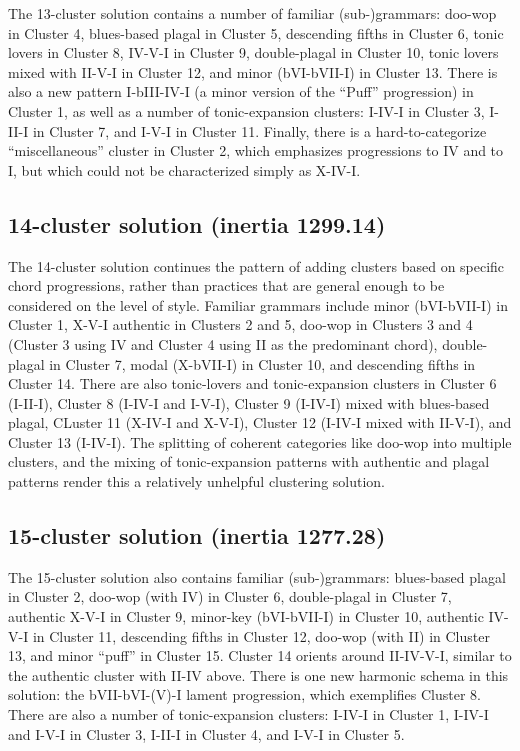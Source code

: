 The 13-cluster solution contains a number of familiar (sub-)grammars: doo-wop in Cluster 4, blues-based plagal in Cluster 5, descending fifths in Cluster 6, tonic lovers in Cluster 8, IV-V-I in Cluster 9, double-plagal in Cluster 10, tonic lovers mixed with II-V-I in Cluster 12, and minor (bVI-bVII-I) in Cluster 13. There is also a new pattern I-bIII-IV-I (a minor version of the ``Puff'' progression) in Cluster 1, as well as a number of tonic-expansion clusters: I-IV-I in Cluster 3, I-II-I in Cluster 7, and I-V-I in Cluster 11. Finally, there is a hard-to-categorize ``miscellaneous'' cluster in Cluster 2, which emphasizes progressions to IV and to I, but which could not be characterized simply as X-IV-I.

\subsection{14-cluster solution (inertia 1299.14)}
\label{14-clustersolutioninertia1299.14}

The 14-cluster solution continues the pattern of adding clusters based on specific chord progressions, rather than practices that are general enough to be considered on the level of style. Familiar grammars include minor (bVI-bVII-I) in Cluster 1, X-V-I authentic in Clusters 2 and 5, doo-wop in Clusters 3 and 4 (Cluster 3 using IV and Cluster 4 using II as the predominant chord), double-plagal in Cluster 7, modal (X-bVII-I) in Cluster 10, and descending fifths in Cluster 14. There are also tonic-lovers and tonic-expansion clusters in Cluster 6 (I-II-I), Cluster 8 (I-IV-I and I-V-I), Cluster 9 (I-IV-I) mixed with blues-based plagal, CLuster 11 (X-IV-I and X-V-I), Cluster 12 (I-IV-I mixed with II-V-I), and Cluster 13 (I-IV-I). The splitting of coherent categories like doo-wop into multiple clusters, and the mixing of tonic-expansion patterns with authentic and plagal patterns render this a relatively unhelpful clustering solution.

\subsection{15-cluster solution (inertia 1277.28)}
\label{15-clustersolutioninertia1277.28}

The 15-cluster solution also contains familiar (sub-)grammars: blues-based plagal in Cluster 2, doo-wop (with IV) in Cluster 6, double-plagal in Cluster 7, authentic X-V-I in Cluster 9, minor-key (bVI-bVII-I) in Cluster 10, authentic IV-V-I in Cluster 11, descending fifths in Cluster 12, doo-wop (with II) in Cluster 13, and minor ``puff'' in Cluster 15. Cluster 14 orients around II-IV-V-I, similar to the authentic cluster with II-IV above. There is one new harmonic schema in this solution: the bVII-bVI-(V)-I lament progression, which exemplifies Cluster 8. There are also a number of tonic-expansion clusters: I-IV-I in Cluster 1, I-IV-I and I-V-I in Cluster 3, I-II-I in Cluster 4, and I-V-I in Cluster 5.

